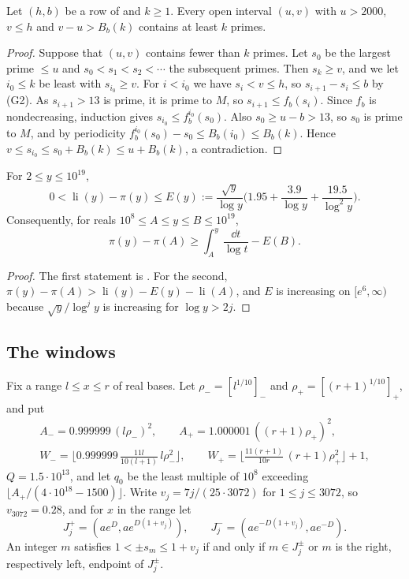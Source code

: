 \documentclass[11pt,colorlinks]{charlie}
\newcommand{\li}{\operatorname{li}}
\begin{document}
\begin{lemma}\label{lem:wheel}
Let $(h,b)$ be a row of  and $k\ge1$. Every open interval $(u,v)$ with $u>2000$, $v\le h$ and $v-u>B_b(k)$ contains at least $k$ primes.
\end{lemma}
\begin{proof}
Suppose that $(u,v)$ contains fewer than $k$ primes. Let $s_0$ be the largest prime $\le u$ and $s_0<s_1<s_2<\cdots$ the subsequent primes. Then $s_k\ge v$, and we let $i_0\le k$ be least with $s_{i_0}\ge v$. For $i<i_0$ we have $s_i<v\le h$, so $s_{i+1}-s_i\le b$ by (G2). As $s_{i+1}>13$ is prime, it is prime to $M$, so $s_{i+1}\le f_b(s_i)$. Since $f_b$ is nondecreasing, induction gives $s_{i_0}\le f_b^{i_0}(s_0)$. Also $s_0\ge u-b>13$, so $s_0$ is prime to $M$, and by periodicity $f_b^{i_0}(s_0)-s_0\le B_b(i_0)\le B_b(k)$. Hence $v\le s_{i_0}\le s_0+B_b(k)\le u+B_b(k)$, a contradiction.
\end{proof}

\begin{lemma}\label{lem:buthe}
For $2\le y\le10^{19}$,
\[
 0<\li(y)-\pi(y)\le E(y):=\frac{\sqrt y}{\log y}\Big(1.95+\frac{3.9}{\log y}+\frac{19.5}{\log^2y}\Big).
\]
Consequently, for reals $10^8\le A\le y\le B\le10^{19}$,
\[
 \pi(y)-\pi(A)\ge\int_A^y\frac{\dd t}{\log t}-E(B).
\]
\end{lemma}
\begin{proof}
The first statement is \cite[Thm.~2]{Buthe}. For the second, $\pi(y)-\pi(A)>\li(y)-E(y)-\li(A)$, and $E$ is increasing on $[e^6,\infty)$ because $\sqrt y/\log^jy$ is increasing for $\log y>2j$.
\end{proof}

\subsection{The windows}
Fix a range $l\le x\le r$ of real bases. Let $\rho_-=[l^{1/10}]_-$ and $\rho_+=[(r+1)^{1/10}]_+$, and put
\[
\begin{gathered}
 A_-=0.999999\,(l\rho_-)^2,\qquad A_+=1.000001\,((r+1)\rho_+)^2,\\
 W_-=\Big\lfloor0.999999\,\frac{11l}{10(l+1)}\,l\rho_-^2\Big\rfloor,\qquad W_+=\Big\lfloor\frac{11(r+1)}{10r}\,(r+1)\rho_+^2\Big\rfloor+1,
\end{gathered}
\]
$Q=1.5\cdot10^{13}$, and let $q_0$ be the least multiple of $10^8$ exceeding $\lfloor A_+/(4\cdot10^{18}-1500)\rfloor$. Write $v_j=7j/(25\cdot3072)$ for $1\le j\le3072$, so $v_{3072}=0.28$, and for $x$ in the range let
\[
 J_j^+=(ae^D,ae^{D(1+v_j)}),\qquad J_j^-=(ae^{-D(1+v_j)},ae^{-D}).
\]
An integer $m$ satisfies $1<\pm s_m\le1+v_j$ if and only if $m\in J_j^\pm$ or $m$ is the right, respectively left, endpoint of $J_j^\pm$.
\end{document}
